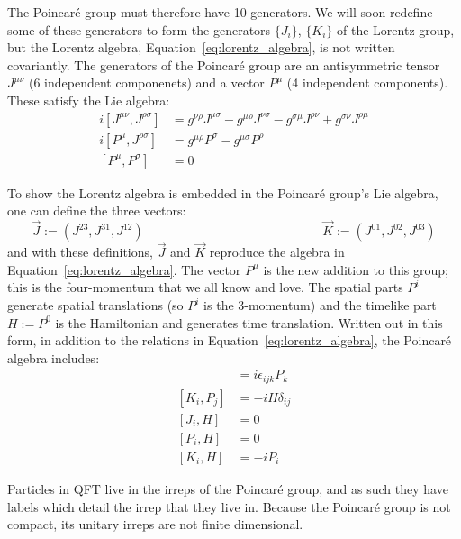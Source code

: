 \documentclass[11pt, oneside]{article}   	%
\theoremstyle{definition}
\begin{document}
The Poincar\'e group must therefore have 10 generators. We will soon redefine some of these generators to form 
the generators $\{J_i\}$, $\{K_i\}$ of the Lorentz group, but the Lorentz algebra, Equation~\ref{eq:lorentz_algebra}, 
is not written covariantly. The generators of the Poincar\'e group are an antisymmetric tensor $J^{\mu\nu}$ (6 
independent componenets) and a vector $P^\mu$ (4 independent components). These satisfy the Lie algebra:
\begin{align}
	i[J^{\mu\nu}, J^{\rho\sigma}] &= g^{\nu\rho} J^{\mu\sigma} - g^{\mu\rho} J^{\nu\sigma} - g^{\sigma\mu} J^{\rho\nu} 
	+ g^{\sigma\nu} J^{\rho\mu} \nonumber \\
	i[P^\mu, J^{\rho\sigma}] &= g^{\mu\rho} P^\sigma - g^{\mu\sigma} P^\rho \label{eq:poincare_algebra} \\
	[P^\mu, P^\sigma] &= 0 \nonumber
\end{align}

To show the Lorentz algebra is embedded in the Poincar\'e group's Lie algebra, one can define the three vectors:
\begin{equation}
	\vec J := (J^{23}, J^{31}, J^{12}) \;\;\;\;\;\;\;\;\;\;\;\;\;\;\;\;\;\;\;\;\;\;\;\;\;\;\;\;\;\;\;\;\;\;\;\;\;\;\;\;\;\;\;\;\;\;\;\;\;\;\;
	\vec K := (J^{01}, J^{02}, J^{03})
\end{equation}
and with these definitions, $\vec J$ and $\vec K$ reproduce the algebra in Equation~\ref{eq:lorentz_algebra}. The 
vector $P^\mu$ is the new addition to this group; this is the four-momentum that we all know and love. The spatial 
parts $P^i$ generate spatial translations (so $P^i$ is the 3-momentum) and the timelike part $H := P^0$ is the Hamiltonian 
and generates time translation. Written out in this form, in addition to the relations in Equation~\ref{eq:lorentz_algebra}, 
the Poincar\'e algebra includes:
\begin{align}
	[J_i, P_j] &= i\epsilon_{ijk} P_k \nonumber \\
	[K_i, P_j] &= -iH\delta_{ij} \nonumber \\
	[J_i, H] &= 0 \label{eq:poincare_algebra_2} \\
	[P_i, H] &= 0 \nonumber \\
	[K_i, H] &= -i P_i\nonumber
\end{align}

Particles in QFT live in the irreps of the Poincar\'e group, and as such they have labels which detail the irrep that they 
live in. Because the Poincar\'e group is not compact, its unitary irreps are not finite dimensional. 
\end{document}
